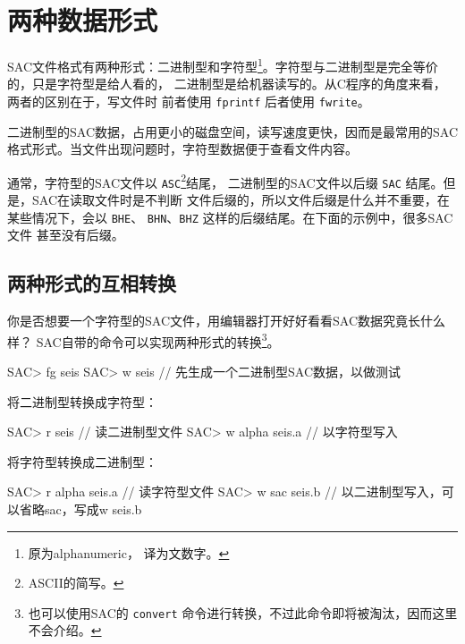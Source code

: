 \section{两种数据形式}
SAC文件格式有两种形式：二进制型和字符型\footnote{原为alphanumeric，
译为文数字。}。字符型与二进制型是完全等价的，只是字符型是给人看的，
二进制型是给机器读写的。从C程序的角度来看，两者的区别在于，写文件时
前者使用 \texttt{fprintf} 后者使用 \texttt{fwrite}。

二进制型的SAC数据，占用更小的磁盘空间，读写速度更快，因而是最常用的SAC
格式形式。当文件出现问题时，字符型数据便于查看文件内容。

通常，字符型的SAC文件以 \texttt{ASC}\footnote{ASCII的简写。}结尾，
二进制型的SAC文件以后缀 \texttt{SAC} 结尾。但是，SAC在读取文件时是不判断
文件后缀的，所以文件后缀是什么并不重要，在某些情况下，会以 \texttt{BHE}、
\texttt{BHN}、\texttt{BHZ} 这样的后缀结尾。在下面的示例中，很多SAC文件
甚至没有后缀。

\subsection{两种形式的互相转换}
你是否想要一个字符型的SAC文件，用编辑器打开好好看看SAC数据究竟长什么样？
SAC自带的命令可以实现两种形式的转换\footnote{也可以使用SAC的
\texttt{convert} 命令进行转换，不过此命令即将被淘汰，因而这里不会介绍。}。
\begin{SACCode}
SAC> fg seis
SAC> w seis             // 先生成一个二进制型SAC数据，以做测试
\end{SACCode}

将二进制型转换成字符型：
\begin{SACCode}
SAC> r seis             // 读二进制型文件
SAC> w alpha seis.a     // 以字符型写入
\end{SACCode}

将字符型转换成二进制型：
\begin{SACCode}
SAC> r alpha seis.a     // 读字符型文件
SAC> w sac seis.b       // 以二进制型写入，可以省略sac，写成w seis.b
\end{SACCode}

